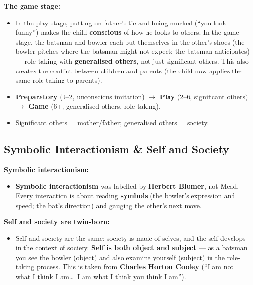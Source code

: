 \begin{ExampleBox}
\textbf{The game stage:}
\begin{itemize}
\item In the play stage, putting on father's tie and being mocked (``you look funny'') makes the child \textbf{conscious} of how he looks to others. In the game stage, the batsman and bowler each put themselves in the other's shoes (the bowler pitches where the batsman might not expect; the batsman anticipates) --- role-taking with \textbf{generalised others}, not just significant others. This also creates the conflict between children and parents (the child now applies the same role-taking to parents).
\end{itemize}
\end{ExampleBox}

\begin{QuickRevision}
\begin{itemize}
\item \textbf{Preparatory} (0--2, unconscious imitation) $\rightarrow$ \textbf{Play} (2--6, significant others) $\rightarrow$ \textbf{Game} (6+, generalised others, role-taking).
\item Significant others = mother/father; generalised others = society.
\end{itemize}
\end{QuickRevision}

\sectiondivider

\subsection{Symbolic Interactionism \& Self and Society}

\begin{KeyConcept}
\textbf{Symbolic interactionism:}
\begin{itemize}
\item \textbf{Symbolic interactionism} was labelled by \textbf{Herbert Blumer}, not Mead. Every interaction is about reading \textbf{symbols} (the bowler's expression and speed; the bat's direction) and gauging the other's next move.
\end{itemize}
\end{KeyConcept}

\begin{KeyConcept}
\textbf{Self and society are twin-born:}
\begin{itemize}
\item Self and society are the same: society is made of selves, and the self develops in the context of society. \textbf{Self is both object and subject} --- as a batsman you see the bowler (object) and also examine yourself (subject) in the role-taking process. This is taken from \textbf{Charles Horton Cooley} (``I am not what I think I am\dots\ I am what I think you think I am'').
\end{itemize}
\end{KeyConcept}

